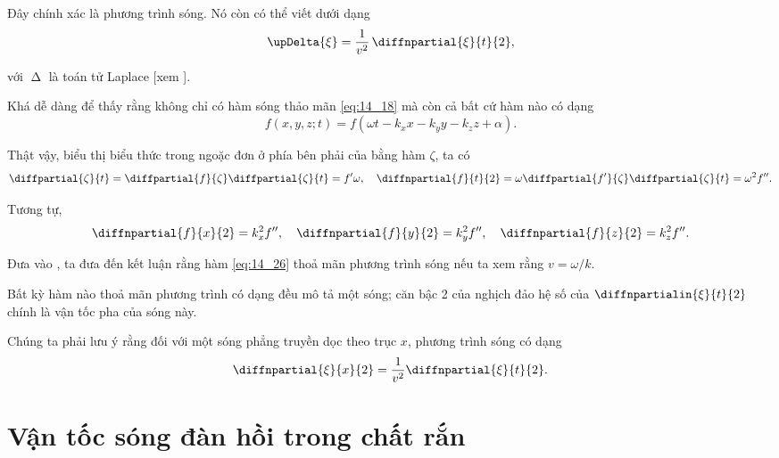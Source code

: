 \noindent
Đây chính xác là phương trình sóng. Nó còn có thể viết dưới dạng
\begin{equation}\label{eq:14:25}
    \upDelta{\xi} = \frac{1}{v^2}\, \diffnpartial{\xi}{t}{2},
\end{equation}

\noindent
với $\upDelta$ là toán tử Laplace [xem ].

Khá dễ dàng để thấy rằng không chỉ có hàm sóng thảo mãn \eqref{eq:14_18} mà còn cả bất cứ hàm nào có dạng
\begin{equation}\label{eq:14_26}
    f(x,y,z;t) = f(\omega t - k_x x - k_y y - k_z z + \alpha).
\end{equation}

\noindent
Thật vậy, biểu thị biểu thức trong ngoặc đơn ở phía bên phải của  bằng hàm $\zeta$, ta có
\begin{equation}\label{eq:14_27}
    \diffpartial{\zeta}{t} = \diffpartial{f}{\zeta} \diffpartial{\zeta}{t} = f' \omega,\quad \diffnpartial{f}{t}{2} = \omega \diffpartial{f'}{\zeta} \diffpartial{\zeta}{t} = \omega^2 f''.
\end{equation}

\noindent
Tương tự,
\begin{equation}\label{eq:14_28}
    \diffnpartial{f}{x}{2} = k_x^2 f'',\quad \diffnpartial{f}{y}{2} = k_y^2 f'',\quad \diffnpartial{f}{z}{2} = k_z^2 f''.
\end{equation}

\noindent
Đưa  vào , ta đưa đến kết luận rằng hàm \eqref{eq:14_26} thoả mãn phương trình sóng nếu ta xem rằng $v = \omega/k$.

Bất kỳ hàm nào thoả mãn phương trình có dạng  đều mô tả một sóng; căn bậc 2 của nghịch đảo hệ số của $\diffnpartialin{\xi}{t}{2}$ chính là vận tốc pha của sóng này.

Chúng ta phải lưu ý rằng đối với một sóng phẳng truyền dọc theo trục $x$, phương trình sóng có dạng
\begin{equation}\label{eq:14_29}
    \diffnpartial{\xi}{x}{2} = \frac{1}{v^2} \diffnpartial{\xi}{t}{2}.
\end{equation}

\section{Vận tốc sóng đàn hồi trong chất rắn}\label{sec:14_5}

